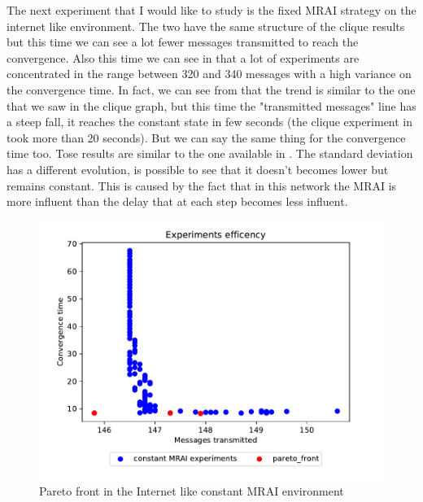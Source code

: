 \documentclass[10pt,conference,letterpaper]{IEEEtran}
\newcommand{\figwidth}{0.78}
\newcommand{\figvspace}{-1.5em}
\begin{document}
The next experiment that I would like to study is the fixed \ac{MRAI} strategy
on the internet like environment.
The two  have the
same structure of the clique results but this time we can see a lot fewer messages
transmitted to reach the convergence.
Also this time we can see in  that a lot of
experiments are concentrated in the range between \num{320} and \num{340} messages
with a high variance on the convergence time.
In fact, we can see from  that the trend is similar
to the one that we saw in the clique graph, but this time the "transmitted messages" line
has a steep fall, it reaches the constant state in few seconds (the clique experiment
in  took more than \num{20} seconds).
But we can say the same thing for the convergence time too.
Tose results are similar to the one available in \cite{griffin2001experimental}.
The standard deviation has a different evolution, is possible to see that it
doesn't becomes lower but remains constant. This is caused by the fact that 
in this network the \ac{MRAI} is more influent than the delay that at each step
becomes less influent.

\begin{figure}[tb]
	\centering
	\includegraphics[width=\figwidth\columnwidth]{images/internet_like/graph-100-constant/pareto-constant}
	\caption{Pareto front in the Internet like constant \ac{MRAI} environment}
	\label{fig:constant_mrai_pareto_freq}
	\vspace{\figvspace}
\end{figure}
\end{document}
